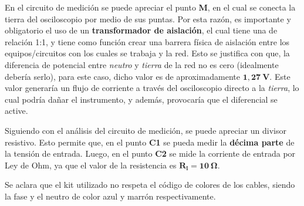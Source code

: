     En el circuito de medición se puede apreciar el punto \textbf{M}, en el cual se conecta la tierra del osciloscopio
    por medio de sus puntas. Por esta razón, es importante y obligatorio el uso de un \textbf{transformador de aislación},
    el cual tiene una de relación 1:1, y tiene como función crear una barrera física de aislación
    entre los equipos/circuitos con los cuales se trabaja y la red. Esto se justifica con que, la diferencia de
    potencial entre \textit{neutro} y \textit{tierra} de la red no es cero (idealmente debería serlo), para este caso, dicho
    valor es de aproximadamente $\mathbf{1,27\ V}$. Este valor generaría un flujo de corriente a través del osciloscopio 
    directo a la \textit{tierra}, lo cual podría dañar el instrumento, y además, provocaría que el diferencial se active.

    Siguiendo con el análisis del circuito de medición, se puede apreciar un divisor resistivo. Esto permite que, en el
    punto \textbf{C1} se pueda medir la \textbf{décima parte} de la tensión de entrada. Luego, en el punto \textbf{C2} 
    se mide la corriente de entrada por Ley de Ohm, ya que el valor de la resistencia es $\mathbf{R_l=10\ \Omega}$.
    
    Se aclara que el kit utilizado no respeta el código de colores de los cables, siendo la fase y el neutro de color azul
    y marrón respectivamente.

    
    











